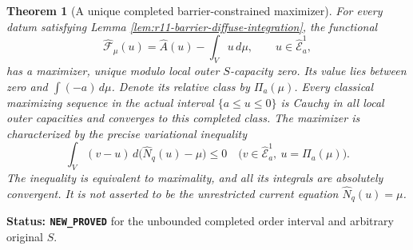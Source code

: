 \documentclass[11pt,a4paper]{article}
\numberwithin{equation}{section}
\newtheorem{theorem}{Theorem}[section]
\theoremstyle{definition}
\theoremstyle{remark}
\begin{document}
\begin{theorem}[A unique completed barrier-constrained maximizer]
\label{thm:r11-completed-barrier-maximizer}
For every datum satisfying Lemma
\ref{lem:r11-barrier-diffuse-integration}, the functional
\[
      \widehat{\mathcal F}_\mu(u)
            =\widehat A(u)-\int_Vu\,d\mu,
              \qquad u\in\widehat{\mathcal E}^1_a,
 \tag{BV7}
\]
has a maximizer, unique modulo local outer
$S$-capacity zero.  Its value lies between zero
and $\int(-a)\,d\mu$.
Denote its relative class by $\Pi_a(\mu)$.
Every classical maximizing sequence in the
actual interval $\{a\leq u\leq0\}$ is Cauchy
in all local outer capacities and converges to
this completed class.
The maximizer is characterized by the precise
variational inequality
\[
 \int_V(v-u)\,d\bigl(\widehat N_q(u)-\mu\bigr)
               \leq0
       \quad\bigl(v\in\widehat{\mathcal E}^1_a,\ u=\Pi_a(\mu)\bigr).
 \tag{BV8}
\]
The inequality is equivalent to maximality, and
all its integrals are absolutely convergent.
It is not asserted to be the unrestricted
current equation $\widehat N_q(u)=\mu$.
\end{theorem}

\noindent\textbf{Status: \texttt{NEW\_PROVED}}
for the unbounded completed order interval and
arbitrary original $S$.
\end{document}
